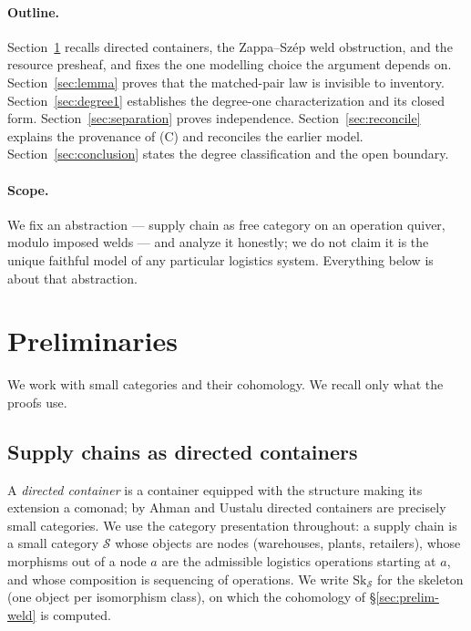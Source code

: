 \documentclass[11pt]{article}
\theoremstyle{definition}
\newcommand{\Sc}{\mathcal{S}}
\newcommand{\Sk}{\mathrm{Sk}}
\begin{document}
\paragraph{Outline.} Section~\ref{sec:prelim} recalls directed containers, the Zappa--Sz\'ep
weld obstruction, and the resource presheaf, and fixes the one modelling choice the argument
depends on. Section~\ref{sec:lemma} proves that the matched-pair law is invisible to inventory.
Section~\ref{sec:degree1} establishes the degree-one characterization and its closed form.
Section~\ref{sec:separation} proves independence. Section~\ref{sec:reconcile} explains the
provenance of (C) and reconciles the earlier model. Section~\ref{sec:conclusion} states the
degree classification and the open boundary.

\paragraph{Scope.} We fix an abstraction --- supply chain as free category on an operation
quiver, modulo imposed welds --- and analyze it honestly; we do not claim it is the unique
faithful model of any particular logistics system. Everything below is about that abstraction.

\section{Preliminaries}\label{sec:prelim}

We work with small categories and their cohomology. We recall only what the proofs use.

\subsection{Supply chains as directed containers}

A \emph{directed container} is a container equipped with the structure making its extension a
comonad; by Ahman and Uustalu \cite{au-dccat} directed containers are precisely small
categories. We use the category presentation throughout: a supply chain is a small category
$\Sc$ whose objects are nodes (warehouses, plants, retailers), whose morphisms out of a node
$a$ are the admissible logistics operations starting at $a$, and whose composition is
sequencing of operations. We write $\Sk_\Sc$ for the skeleton (one object per isomorphism
class), on which the cohomology of \S\ref{sec:prelim-weld} is computed.
\end{document}
